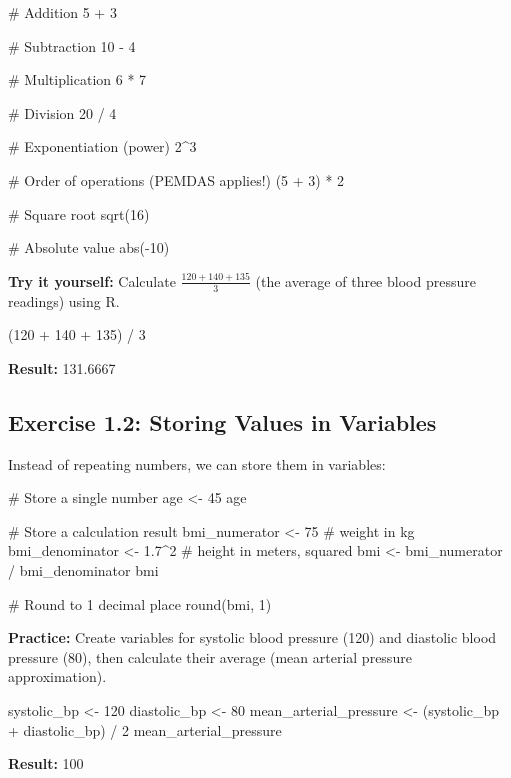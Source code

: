 \documentclass[11pt]{article}
\begin{document}
\begin{rcode}
# Addition
5 + 3

# Subtraction
10 - 4

# Multiplication
6 * 7

# Division
20 / 4

# Exponentiation (power)
2^3

# Order of operations (PEMDAS applies!)
(5 + 3) * 2

# Square root
sqrt(16)

# Absolute value
abs(-10)
\end{rcode}

\textbf{Try it yourself:} Calculate $\frac{120 + 140 + 135}{3}$ (the average of three blood pressure readings) using R.

\begin{answerbox}
\begin{rcode}
(120 + 140 + 135) / 3
\end{rcode}

\textbf{Result:} 131.6667
\end{answerbox}

\subsection{Exercise 1.2: Storing Values in Variables}

Instead of repeating numbers, we can store them in variables:

\begin{rcode}
# Store a single number
age <- 45
age

# Store a calculation result
bmi_numerator <- 75  # weight in kg
bmi_denominator <- 1.7^2  # height in meters, squared
bmi <- bmi_numerator / bmi_denominator
bmi

# Round to 1 decimal place
round(bmi, 1)
\end{rcode}

\textbf{Practice:} Create variables for systolic blood pressure (120) and diastolic blood pressure (80), then calculate their average (mean arterial pressure approximation).

\begin{answerbox}
\begin{rcode}
systolic_bp <- 120
diastolic_bp <- 80
mean_arterial_pressure <- (systolic_bp + diastolic_bp) / 2
mean_arterial_pressure
\end{rcode}

\textbf{Result:} 100
\end{answerbox}
\end{document}
